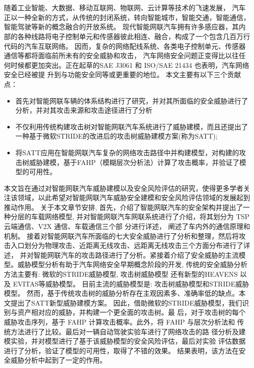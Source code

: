 \vspace{-2.5cm}
\chapter*{\xiaosan {}}
\hspace{-0.5cm}
随着工业智能、大数据、移动互联网、物联网、云计算等技术的飞速发展，
汽车正以一种全新的方式，从传统的封闭系统，转向智能城市，智能交通，智能通信，智能驾驶等新的概念融合的开放系统。
现代智能网联汽车拥有许多感应器，其内部的各种线路将电子控制单元和传感器彼此相连、融合，构成了一个包含几百万行代码的汽车互联网络。
因而，复杂的网络配线系统、各类电子控制单元、传感器通信等都将面临前所未有的安全威胁和攻击，
汽车网络安全问题正变得比以往任何时候都更加突出。正在起草的SAE J3061\cite{schmittner2016using} 和 ISO/SAE 21434 \cite{schneider2022iso} 也表明，汽车网络安全已经被提
升到与功能安全同等或更重要的地位。
本文主要有以下三个贡献点：
\begin{itemize}
    \item 首先对智能网联车辆的体系结构进行了研究，并对其所面临的安全威胁进行了分析，并对其攻击来源和攻击途径进行了分析
    \item 不仅利用传统构建攻击树对智能网联汽车系统进行了威胁建模，而且还提出了一种基于微软STRIDE的改进后的攻击树威胁建模方案(称为SATT);
    \item 将SATT应用在智能网联汽车复杂的网络攻击路径中并构建模型，对构建的攻击树威胁建模，基于FAHP（模糊层次分析法）计算了攻击概率，并验证了模型的可用性。
  \end{itemize}
本文旨在通过对智能网联汽车威胁建模以及安全风险评估的研究，使得更多学者关注该领域，以此希望对智能网联汽车威胁安全建模和安全风险评估领域的发展起到推动作用。
关于本文章节安排, 首先，介绍了智能网联汽车的安全架构并提出了一种分层的车载网络模型, 
并对智能网联汽车网联系统进行了介绍，将其划分为 TSP 云端通信、V2X 通信、车载通信三个部 分进行详述，
阐述了车内外的通信原理和机制。
接着对智能网联汽车所面临的七大安全威胁进行了分析和整理，然后将攻击入口划分为物理攻击、近距离无线攻击、远距离无线攻击三个方面分布进行了详述，
并对智能网联汽车的攻击路径进行了分析。紧接着介绍了安全威胁的主流模型。威胁模型分析有助于汽车网络安全早期概念阶段的开发,
传统的安全威胁分析方法主要有: 微软的STRIDE威胁模型, 攻击树威胁模型 还有新型的HEAVENS 以及 EVITAS等威胁模型。 
目前主流的威胁模型是: 攻击树威胁模型和STRIDE威胁模型。
然而，基于传统攻击树的威胁分析存在主观因素多、准确率低的缺点。本文提出了SATT新型威胁建模方案。
因此，借助微软的STRIDE威胁模型，我们识别与资产相对应的威胁，并构建一个更全面的攻击树。最
后，对于攻击树的每个威胁攻击序列，基于 FAHP 计算攻击概率。此外，将 FAHP 与层次分析法和
传统方法进行了比较。最后对一辆自动驾驶实验车进行了网络攻击的路
径分析及建模实验，并对模型进行了基于该威胁模型的安全风险评估，最后对实验
评估数据进行了分析，验证了模型的可用性，取得了不错的效果。
结果表明，该方法在安全威胁分析中起到了一定的作用。

 